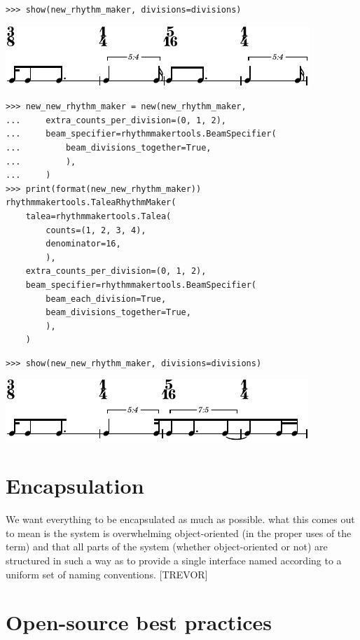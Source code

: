\documentclass{article}
\begin{document}
\begin{lstlisting}
>>> show(new_rhythm_maker, divisions=divisions)
\end{lstlisting}

\noindent\includegraphics[scale=1.0]{images/abjad-13.pdf}


\begin{lstlisting}
>>> new_new_rhythm_maker = new(new_rhythm_maker,
...     extra_counts_per_division=(0, 1, 2),
...     beam_specifier=rhythmmakertools.BeamSpecifier(
...         beam_divisions_together=True,
...         ),
...     )
>>> print(format(new_new_rhythm_maker))
rhythmmakertools.TaleaRhythmMaker(
    talea=rhythmmakertools.Talea(
        counts=(1, 2, 3, 4),
        denominator=16,
        ),
    extra_counts_per_division=(0, 1, 2),
    beam_specifier=rhythmmakertools.BeamSpecifier(
        beam_each_division=True,
        beam_divisions_together=True,
        ),
    )
\end{lstlisting}


\begin{lstlisting}
>>> show(new_new_rhythm_maker, divisions=divisions)
\end{lstlisting}

\noindent\includegraphics[scale=1.0]{images/abjad-14.pdf}


\section{Encapsulation}

We want everything to be encapsulated as much as possible. what this comes out
to mean is the system is overwhelming object-oriented (in the proper uses of
the term) and that all parts of the system (whether object-oriented or not) are
structured in such a way as to provide a single interface named according to a
uniform set of naming conventions. [TREVOR]

\section{Open-source best practices}
\end{document}
